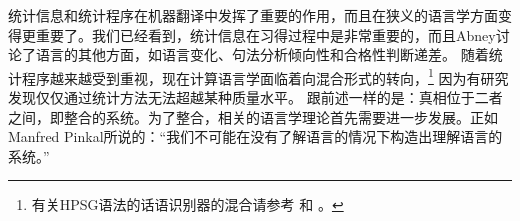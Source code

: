 统计信息和统计程序在机器翻译中发挥了重要的作用，而且在狭义的语言学方面变得更重要了\citep{Abney96a}。我们已经看到，统计信息在习得过程中是非常重要的，而且Abney讨论了语言的其他方面，如语言变化、句法分析倾向性和合格性判断递差。
随着统计程序越来越受到重视，现在计算语言学面临着向混合形式的转向，\footnote{%
有关HPSG语法的话语识别器的混合请参考 和 。
}
因为有研究发现仅仅通过统计方法无法超越某种质量水平\citep{Steedman2011a,Church2011a,Kay2011a}。
跟前述一样的是：真相位于二者之间，即整合的系统。为了整合，相关的语言学理论首先需要进一步发展。正如Manfred Pinkal所说的：“我们不可能在没有了解语言的情况下构造出理解语言的系统。”


